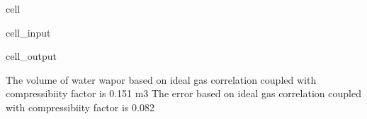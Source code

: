 \documentclass[letterpaper,10pt,english]{jupyterBook}
\begin{document}
\begin{sphinxuseclass}{cell}\begin{sphinxVerbatimInput}

\begin{sphinxuseclass}{cell_input}
\begin{sphinxVerbatim}[commandchars=\\\{\}]
          

    
\end{sphinxVerbatim}

\end{sphinxuseclass}\end{sphinxVerbatimInput}
\begin{sphinxVerbatimOutput}

\begin{sphinxuseclass}{cell_output}
\begin{sphinxVerbatim}[commandchars=\\\{\}]
The volume of water wapor based on ideal gas correlation coupled with compressibiity factor is 0.151 m3
The error based on ideal gas correlation coupled with compressibiity factor is 0.082 \PYGZpc{}
\end{sphinxVerbatim}

\end{sphinxuseclass}\end{sphinxVerbatimOutput}

\end{sphinxuseclass}
\end{document}
